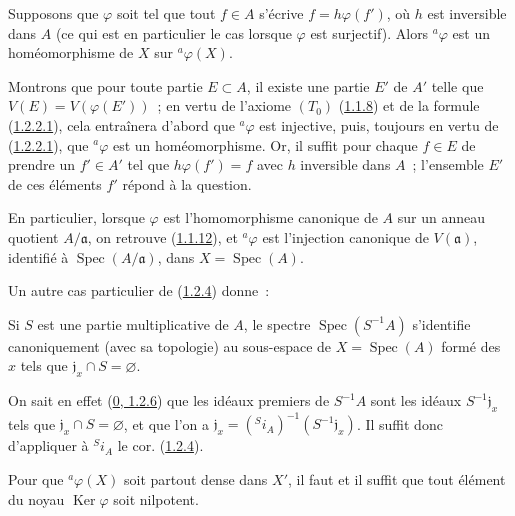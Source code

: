 \begin{corollary}[1.2.4]
\label{I.1.2.4-fr}
Supposons que $\varphi$ soit tel que tout $f\in A$ s'écrive
$f=h\varphi(f')$, où $h$ est inversible dans $A$ (ce qui est en particulier
le cas lorsque $\varphi$ est surjectif). Alors ${}^a\varphi$ est un
homéomorphisme de $X$ sur ${}^a\varphi(X)$.
\end{corollary}

Montrons que pour toute partie $E\subset A$, il existe une partie $E'$ de
$A'$ telle que $V(E)=V(\varphi(E'))$~; en vertu de l'axiome $(T_0)$
(\hyperref[I.1.1.8-fr]{1.1.8}) et de la formule
(\hyperref[I.1.2.2.1-fr]{1.2.2.1}), cela entraînera d'abord que
${}^a\varphi$ est injective, puis, toujours en vertu de
(\hyperref[I.1.2.2.1-fr]{1.2.2.1}), que ${}^a\varphi$ est un
homéomorphisme. Or, il suffit pour chaque $f\in E$ de prendre un $f'\in A'$ tel
que $h\varphi(f')=f$ avec $h$ inversible dans $A$~; l'ensemble $E'$ de ces
éléments $f'$ répond à la question.

\begin{env}[1.2.5]
\label{I.1.2.5-fr}
En particulier, lorsque $\varphi$ est l'homomorphisme canonique de $A$ sur un
anneau quotient $A/\mathfrak{a}$, on retrouve
(\hyperref[I.1.1.12-fr]{1.1.12}), et ${}^a\varphi$ est l'injection canonique
de $V(\mathfrak{a})$, identifié à $\operatorname{Spec}(A/\mathfrak{a})$,
dans $X=\operatorname{Spec}(A)$.
\end{env}

Un autre cas particulier de (\hyperref[I.1.2.4-fr]{1.2.4}) donne~:

\begin{corollary}[1.2.6]
\label{I.1.2.6-fr}
Si $S$ est une partie multiplicative de $A$, le spectre
$\operatorname{Spec}(S^{-1}A)$ s'identifie canoniquement (avec sa topologie)
au sous-espace de $X=\operatorname{Spec}(A)$ formé des $x$ tels que
$\mathfrak{j}_x\cap S=\varnothing$.
\end{corollary}

On sait en effet (\hyperref[0.1.2.6-fr]{0, 1.2.6}) que les idéaux premiers de
$S^{-1}A$ sont les idéaux $S^{-1}\mathfrak{j}_x$ tels que
$\mathfrak{j}_x\cap S=\varnothing$, et que l'on a
$\mathfrak{j}_x=({}^S i_A)^{-1}(S^{-1}\mathfrak{j}_x)$. Il suffit donc
d'appliquer à ${}^S i_A$ le cor. (\hyperref[I.1.2.4-fr]{1.2.4}).

\begin{corollary}[1.2.7]
\label{I.1.2.7-fr}
Pour que ${}^a\varphi(X)$ soit partout dense dans $X'$, il faut et il suffit
que tout élément du noyau $\operatorname{Ker}\varphi$ soit nilpotent.
\end{corollary}

